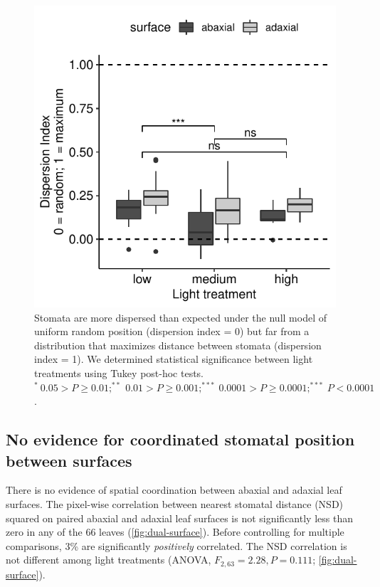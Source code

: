 \documentclass[12pt,halfline,a4paper,]{ouparticle}
\begin{document}
\begin{figure}[ht]
\includegraphics[width=\textwidth]{figures/single-surface.pdf}
\caption{Stomata are more dispersed than expected under the null model of uniform random position (dispersion index = 0) but far from a distribution that maximizes distance between stomata (dispersion index = 1). We determined statistical significance between light treatments using Tukey post-hoc tests. $^*~0.05 > P \ge 0.01; ^{**}~0.01 > P \ge 0.001; ^{***}~0.0001 > P \ge 0.0001; ^{***}~ P <0.0001$.}
\label{fig:single-surface}
\end{figure}

\hypertarget{no-evidence-for-coordinated-stomatal-position-between-surfaces}{%
\subsection{No evidence for coordinated stomatal position between
surfaces}\label{no-evidence-for-coordinated-stomatal-position-between-surfaces}}

There is no evidence of spatial coordination between abaxial and adaxial
leaf surfaces. The pixel-wise correlation between nearest stomatal
distance (NSD) squared on paired abaxial and adaxial leaf surfaces is
not significantly less than zero in any of the 66 leaves
(\autoref{fig:dual-surface}). Before controlling for multiple
comparisons, 3\% are significantly \emph{positively} correlated. The NSD
correlation is not different among light treatments (ANOVA,
\(F_{2,63} = 2.28, P = 0.111\); \autoref{fig:dual-surface}).
\end{document}
